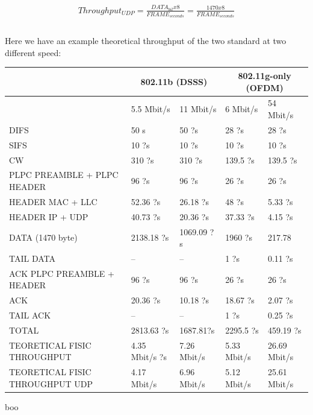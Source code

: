 	\begin{gather*}
		Throughput_{UDP} = \frac{ DATA_{bit} x 8 }{ FRAME_{seconds} } = \frac{ 1470 x 8 }{  FRAME_{seconds} } \\\\
	\end{gather*}
	
	Here we have an example theoretical throughput of the two standard at two different speed:
	
	\begin{table}[h!]
		\begin{tabularx}{15cm}{ | X | X | X | X | X | }
			\hline
				 & \multicolumn{2}{|c|}{ 802.11b (DSSS)} & \multicolumn{2}{|c|}{ 802.11g-only (OFDM)} \\
				 \hline
				 & 5.5 Mbit/s & 11 Mbit/s & 6 Mbit/s & 54 Mbit/s \\
			\hline
				DIFS & 50 \nano s & 50 ?s & 28 ?s & 28 ?s \\
			\hline
				SIFS & 10 ?s & 10 ?s & 10 ?s & 10 ?s \\
			\hline
				CW & 310 ?s & 310 ?s & 139.5 ?s & 139.5 ?s \\
			\hline
				PLPC PREAMBLE + PLPC HEADER & 96 ?s & 96 ?s & 26 ?s & 26 ?s \\
			\hline
				HEADER MAC + LLC & 52.36 ?s & 26.18 ?s & 48 ?s & 5.33 ?s \\
			\hline
				HEADER IP + UDP & 40.73 ?s & 20.36 ?s & 37.33 ?s & 4.15 ?s \\
			\hline
				DATA (1470 byte)& 2138.18 ?s & 1069.09 ?s & 1960 ?s & 217.78 \\
			\hline
				TAIL DATA & -- & -- & 1 ?s & 0.11 ?s \\
			\hline
				ACK PLPC PREAMBLE + HEADER & 96 ?s & 96 ?s & 26 ?s & 26 ?s \\
			\hline
				ACK & 20.36 ?s & 10.18 ?s & 18.67 ?s & 2.07 ?s \\
			\hline
				TAIL ACK & -- & -- & 1 ?s & 0.25 ?s \\
			\hline
			\hline
				TOTAL & 2813.63 ?s & 1687.81?s & 2295.5 ?s & 459.19 ?s \\
			\hline
			\hline
				TEORETICAL FISIC THROUGHPUT & 4.35 Mbit/s ?s & 7.26 Mbit/s & 5.33 Mbit/s & 26.69 Mbit/s \\
			\hline
			\hline
				TEORETICAL FISIC THROUGHPUT UDP & 4.17 Mbit/s & 6.96 Mbit/s & 5.12 Mbit/s & 25.61 Mbit/s \\
			\hline
			
		\end{tabularx}
	\end{table}
	
	boo
	

	








